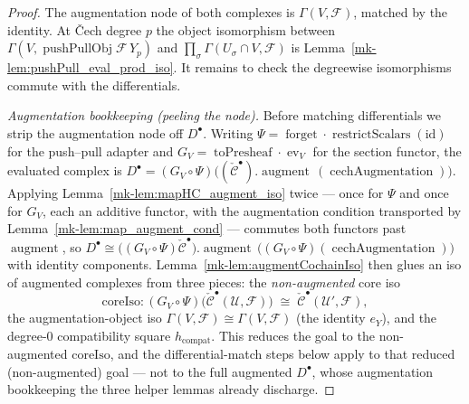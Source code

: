 \begin{proof}
  The augmentation node of both complexes is \(\Gamma(V, \mathcal{F})\), matched by the
  identity. At {\v C}ech degree \(p\) the object isomorphism between
  \(\Gamma(V, \operatorname{pushPullObj}\mathcal{F}\,Y_p)\) and \(\prod_\sigma \Gamma(U_\sigma
  \cap V, \mathcal{F})\) is Lemma~\ref{mk-lem:pushPull_eval_prod_iso}. It remains to check the
  degreewise isomorphisms commute with the differentials.

  \emph{Augmentation bookkeeping (peeling the node).} Before matching differentials we strip the
  augmentation node off \(D^\bullet\). Writing \(\Psi = \operatorname{forget} \cdot
  \operatorname{restrictScalars}(\mathrm{id})\) for the push--pull adapter and \(G_V =
  \operatorname{toPresheaf} \cdot \operatorname{ev}_{V}\) for the section functor, the evaluated
  complex is \(D^\bullet = (G_V \circ \Psi)\bigl((\check{\mathcal{C}}^\bullet)
  .\operatorname{augment}\,(\operatorname{cechAugmentation})\bigr)\). Applying
  Lemma~\ref{mk-lem:mapHC_augment_iso} twice --- once for \(\Psi\) and once for \(G_V\), each an
  additive functor, with the augmentation condition transported by
  Lemma~\ref{mk-lem:map_augment_cond} --- commutes both functors past
  \(\operatorname{augment}\), so \(D^\bullet \cong \bigl((G_V \circ \Psi)
  \check{\mathcal{C}}^\bullet\bigr).\operatorname{augment}\,\bigl((G_V \circ \Psi)
  (\operatorname{cechAugmentation})\bigr)\) with identity components. Lemma~\ref{mk-lem:augmentCochainIso}
  then glues an iso of augmented complexes from three pieces: the \emph{non-augmented} core iso
  \[
    \mathrm{coreIso} : (G_V \circ \Psi)\bigl(\check{\mathcal{C}}^\bullet(\mathcal{U},
      \mathcal{F})\bigr) \;\cong\; \check{\mathcal{C}}^\bullet(\mathcal{U}', \mathcal{F}),
  \]
  the augmentation-object iso \(\Gamma(V, \mathcal{F}) \cong \Gamma(V, \mathcal{F})\) (the
  identity \(e_Y\)), and the degree-\(0\) compatibility square \(h_{\mathrm{compat}}\). This
  reduces the goal to the non-augmented \(\mathrm{coreIso}\), and the differential-match steps
  below apply to that reduced (non-augmented) goal --- not to the full augmented \(D^\bullet\),
  whose augmentation bookkeeping the three helper lemmas already discharge.


\end{proof}
